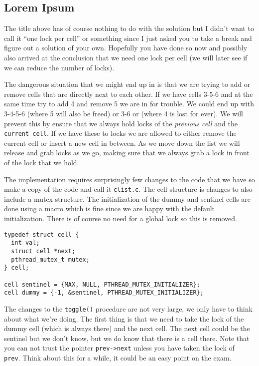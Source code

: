\documentclass[a4paper,11pt]{article}
\begin{document}
\subsection{Lorem Ipsum}

The title above has of course nothing to do with the solution but I
didn't want to call it ``one lock per cell'' or something since I just
asked you to take a break and figure out a solution of your
own. Hopefully you have done so now and possibly also arrived at the
conclusion that we need one lock per cell (we will later see if we can
reduce the number of locks).

The dangerous situation that we might end up in is that we are trying
to add or remove cells that are directly next to each other. If we
have cells 3-5-6 and at the same time try to add 4 and remove 5 we are
in for trouble. We could end up with 3-4-5-6 (where 5 will also be
freed) or 3-6 or (where 4 is lost for ever). We will prevent this by
ensure that we always hold locks of the {\em previous cell} and the
{\tt current cell}. If we have these to locks we are allowed to either
remove the current cell or insert a new cell in between. As we move
down the list we will release and grab locks as we go, making sure
that we always grab a lock in front of the lock that we hold.

The implementation requires surprisingly few changes to the code that
we have so make a copy of the code and call it {\tt clist.c}. The cell
structure is changes to also include a mutex structure. The
initialization of the dummy and sentinel cells are done using a
macro which is fine since we are happy with the default
initialization. There is of course no need for a global lock so this is
removed.

\begin{lstlisting}
typedef struct cell {
  int val;
  struct cell *next;
  pthread_mutex_t mutex;
} cell;

cell sentinel = {MAX, NULL, PTHREAD_MUTEX_INITIALIZER};
cell dummy = {-1, &sentinel, PTHREAD_MUTEX_INITIALIZER};
\end{lstlisting}

The changes to the {\tt toggle()} procedure are not very large, we
only have to think about what we're doing. The first thing is that we
need to take the lock of the dummy cell (which is always there) and
the next cell. The next cell could be the sentinel but we don't know,
but we do know that there is a cell there. Note that you can not trust
the pointer {\tt prev->next} unless you have taken the lock of {\tt
  prev}. Think about this for a while, it could be an easy point on
the exam.
\end{document}
